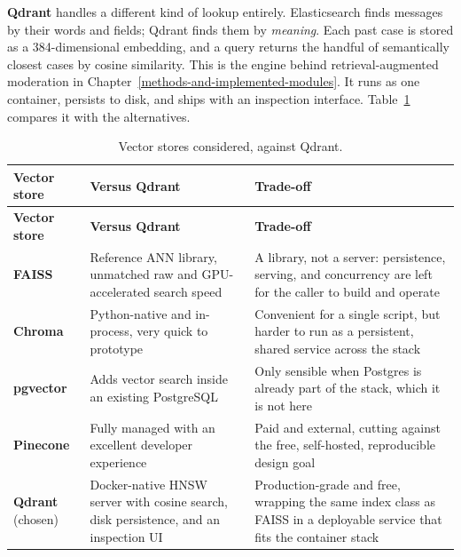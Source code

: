 \textbf{Qdrant} handles a different kind of lookup entirely. Elasticsearch finds messages by their words and fields; Qdrant finds them by \emph{meaning}. Each past case is stored as a 384-dimensional embedding, and a query returns the handful of semantically closest cases by cosine similarity. This is the engine behind retrieval-augmented moderation in Chapter~\ref{methods-and-implemented-modules}. It runs as one container, persists to disk, and ships with an inspection interface. Table~\ref{tab:vectorstores} compares it with the alternatives.
\renewcommand{\arraystretch}{1.5} 

\begin{longtable}{@{}
  >{\raggedright\arraybackslash}p{}
  >{\raggedright\arraybackslash}p{}
  >{\raggedright\arraybackslash}p{}@{}}
\caption{Vector stores considered, against Qdrant.}\label{tab:vectorstores}\tabularnewline
\toprule
\textbf{Vector store} & \textbf{Versus Qdrant} & \textbf{Trade-off} \\
\midrule
\endfirsthead
\toprule
\textbf{Vector store} & \textbf{Versus Qdrant} & \textbf{Trade-off} \\
\midrule
\endhead
\bottomrule
\endlastfoot

\textbf{FAISS} & Reference ANN library, unmatched raw and GPU-accelerated search speed & A library, not a server: persistence, serving, and concurrency are left for the caller to build and operate \\
\addlinespace[1em]

\textbf{Chroma} & Python-native and in-process, very quick to prototype & Convenient for a single script, but harder to run as a persistent, shared service across the stack \\
\addlinespace[1em]

\textbf{pgvector} & Adds vector search inside an existing PostgreSQL & Only sensible when Postgres is already part of the stack, which it is not here \\
\addlinespace[1em]

\textbf{Pinecone} & Fully managed with an excellent developer experience & Paid and external, cutting against the free, self-hosted, reproducible design goal \\
\addlinespace[1em]

\textbf{Qdrant} (chosen) & Docker-native HNSW server with cosine search, disk persistence, and an inspection UI & Production-grade and free, wrapping the same index class as FAISS in a deployable service that fits the container stack \\

\end{longtable}
\renewcommand{\arraystretch}{1.0}

